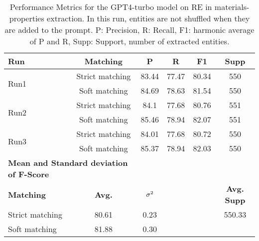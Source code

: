 \begin{table}[htbp]
    \small
    \centering
    \caption{Performance Metrics for the GPT4-turbo model on RE in materials-properties extraction. In this run, entities are not shuffled when they are added to the prompt. P: Precision, R: Recall, F1: harmonic average of P and R, Supp: Support, number of extracted entities.}
    \begin{tabular}{lccccc}
        \toprule
        \textbf{Run} & \textbf{Matching} & \textbf{P} & \textbf{R} & \textbf{F1} & \textbf{Supp}\\
        \midrule
        \multirow{2}{*}{Run1} & Strict matching & 83.44 & 77.47 & 80.34 & 550 \\
        & Soft matching & 84.69 & 78.63 & 81.54 & 550 \\
        \midrule
        \multirow{2}{*}{Run2} & Strict matching & 84.1 & 77.68 & 80.76 & 551 \\
        & Soft matching & 85.46 & 78.94 & 82.07 & 551 \\
        \midrule
        \multirow{2}{*}{Run3} & Strict matching & 84.01 & 77.68 & 80.72 & 550 \\
        & Soft matching & 85.37 & 78.94 & 82.03 & 550 \\
        \midrule
        \multicolumn{2}{l}{\textbf{Mean and Standard deviation of F-Score}} & & & & \\
        \midrule
        \textbf{Matching} & \textbf{Avg.} & $\sigma\textsuperscript{2}$ & & & \textbf{Avg. Supp}\\
        Strict matching & 80.61 & 0.23 & & & 550.33 \\
        Soft matching & 81.88 & 0.30 & & \\
        \bottomrule
    \end{tabular}
\end{table}


